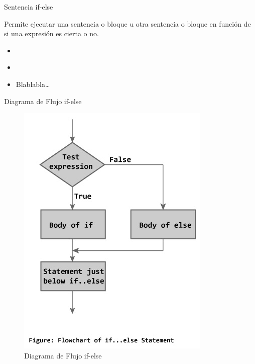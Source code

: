\begin{frame}[fragile]{Sentencia if-else}

Permite ejecutar una sentencia o bloque u otra sentencia o bloque en
función de si una expresión es cierta o no.

\begin{itemize}
\item
\begin{Shaded}
\begin{Highlighting}[]
 
\end{Highlighting}
\end{Shaded}
\item
\begin{Shaded}
\begin{Highlighting}[]
 
    \NormalTok{\{}
    \NormalTok{\}}
\end{Highlighting}
\end{Shaded}
\item
  Blablabla\ldots{}
\end{itemize}

\end{frame}

\begin{frame}{Diagrama de Flujo if-else}

\begin{figure}[htbp]
\centering
\includegraphics{if-else.jpg}
\caption{Diagrama de Flujo if-else}
\end{figure}

\end{frame}

